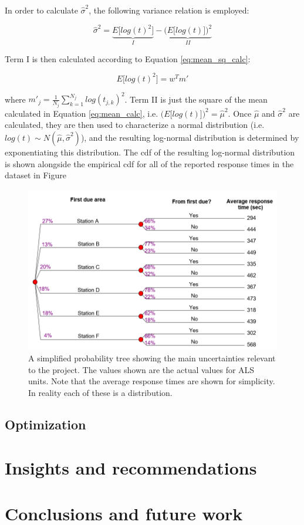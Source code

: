 \documentclass[article]{proc}
\begin{document}
In order to calculate $\hat\sigma^2$, the following variance relation is employed:


\begin{equation}
\hat\sigma^2 = \underbrace{E\big[log(t)^2\big]}_{I} - \underbrace{\bigg(E\big[log(t)\big]\bigg)^2}_{II}
\label{eq:var}
\end{equation}

Term I is then calculated according to Equation \ref{eq:mean_sq_calc}:

\begin{equation}
E\big[log(t)^2\big] = w^Tm'
\label{eq:mean_sq_calc}
\end{equation}

where 
$m'_j = \frac{1}{N_j}\sum_{k=1}^{N_j}log(t_{j,k})^2$. Term II is just the square of the mean calculated in Equation \ref{eq:mean_calc}, i.e. $\big(E\big[log(t)\big]\big)^2 = \hat\mu^2$. Once $\hat\mu$ and $\hat\sigma^2$ are calculated, they are then used to characterize a normal distribution (i.e. $ log(t) \sim N(\hat\mu, \hat\sigma^2)$), and the resulting log-normal distribution is determined by exponentiating this distribution. The cdf of the resulting log-normal distribution is shown alongside the empirical cdf for all of the reported response times in the dataset in Figure 


\begin{figure}[!htb]
  \centering
  \includegraphics[width=16cm,keepaspectratio]{Figures/alstree.PNG}
  \caption{A simplified probability tree showing the main uncertainties relevant to the project. The values shown are the actual values for ALS units. Note that the average response times are shown for simplicity. In reality each of these is a distribution.}
  \label{fig:alstree}
\end{figure}






\subsection{Optimization}



\section{Insights and recommendations}


\section{Conclusions and future work}





\scriptsize{

}
\end{document}
